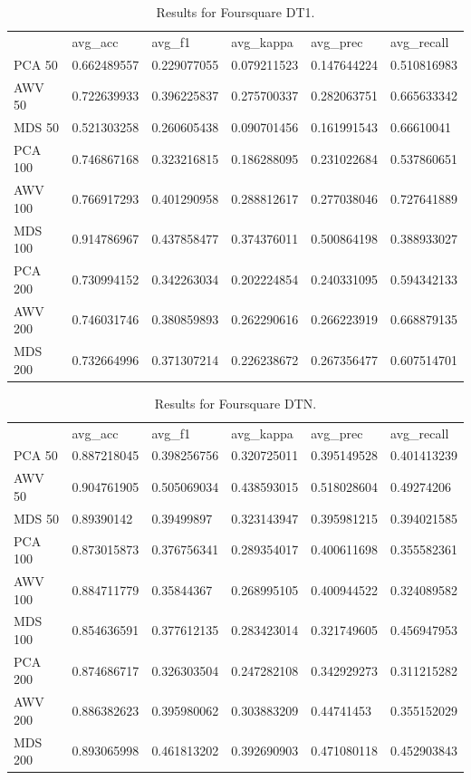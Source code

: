 \begin{table}[]
\begin{tabular}{llllll}
	& avg\_acc    & avg\_f1     & avg\_kappa  & avg\_prec   & avg\_recall \\
	PCA 50  & 0.662489557 & 0.229077055 & 0.079211523 & 0.147644224 & 0.510816983 \\
	AWV 50  & 0.722639933 & 0.396225837 & 0.275700337 & 0.282063751 & 0.665633342 \\
	MDS 50  & 0.521303258 & 0.260605438 & 0.090701456 & 0.161991543 & 0.66610041  \\
	PCA 100 & 0.746867168 & 0.323216815 & 0.186288095 & 0.231022684 & 0.537860651 \\
	AWV 100 & 0.766917293 & 0.401290958 & 0.288812617 & 0.277038046 & 0.727641889 \\
	MDS 100 & 0.914786967 & 0.437858477 & 0.374376011 & 0.500864198 & 0.388933027 \\
	PCA 200 & 0.730994152 & 0.342263034 & 0.202224854 & 0.240331095 & 0.594342133 \\
	AWV 200 & 0.746031746 & 0.380859893 & 0.262290616 & 0.266223919 & 0.668879135 \\
	MDS 200 & 0.732664996 & 0.371307214 & 0.226238672 & 0.267356477 & 0.607514701
\end{tabular}
\caption{Results for Foursquare DT1.}
\label{table:Newsgroups}
\end{table}

\begin{table}[]
\begin{tabular}{llllll}
	& avg\_acc    & avg\_f1     & avg\_kappa  & avg\_prec   & avg\_recall \\
	PCA 50  & 0.887218045 & 0.398256756 & 0.320725011 & 0.395149528 & 0.401413239 \\
	AWV 50  & 0.904761905 & 0.505069034 & 0.438593015 & 0.518028604 & 0.49274206  \\
	MDS 50  & 0.89390142  & 0.39499897  & 0.323143947 & 0.395981215 & 0.394021585 \\
	PCA 100 & 0.873015873 & 0.376756341 & 0.289354017 & 0.400611698 & 0.355582361 \\
	AWV 100 & 0.884711779 & 0.35844367  & 0.268995105 & 0.400944522 & 0.324089582 \\
	MDS 100 & 0.854636591 & 0.377612135 & 0.283423014 & 0.321749605 & 0.456947953 \\
	PCA 200 & 0.874686717 & 0.326303504 & 0.247282108 & 0.342929273 & 0.311215282 \\
	AWV 200 & 0.886382623 & 0.395980062 & 0.303883209 & 0.44741453  & 0.355152029 \\
	MDS 200 & 0.893065998 & 0.461813202 & 0.392690903 & 0.471080118 & 0.452903843
\end{tabular}
\caption{Results for Foursquare DTN.}
\label{table:Newsgroups}
\end{table}

